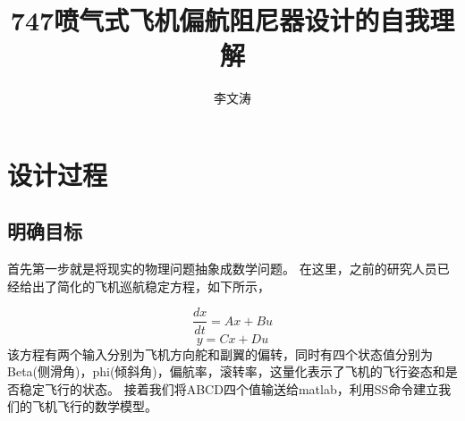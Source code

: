\documentclass[AutoFakeBold]{LZUThesis}
\begin{document}
%
%


\title{{747喷气式飞机偏航阻尼器设计的自我理解}}




\author{李文涛}



\maketitle
\frontmatter







\mainmatter

\chapter{设计过程}

\section{明确目标}
首先第一步就是将现实的物理问题抽象成数学问题。
在这里，之前的研究人员已经给出了简化的飞机巡航稳定方程，如下所示，

\begin{equation}
\frac{dx}{dt} =Ax+Bu
\end{equation}
\begin{equation}
y=Cx+Du
\end{equation}
该方程有两个输入分别为飞机方向舵和副翼的偏转，同时有四个状态值分别为Beta(侧滑角)，phi(倾斜角)，偏航率，滚转率，这量化表示了飞机的飞行姿态和是否稳定飞行的状态。
接着我们将ABCD四个值输送给matlab，利用SS命令建立我们的飞机飞行的数学模型。
\end{document}
